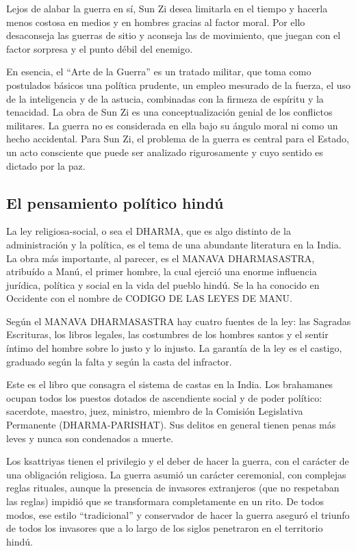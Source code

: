 \documentclass[
]{book}
\begin{document}
Lejos de alabar la guerra en sí, Sun Zi desea limitarla en el tiempo y hacerla menos costosa en medios y en hombres gracias al factor moral. Por ello desaconseja las guerras de sitio y aconseja las de movimiento, que juegan con el factor sorpresa y el punto débil del enemigo.

En esencia, el ``Arte de la Guerra'' es un tratado militar, que toma como postulados básicos una política prudente, un empleo mesurado de la fuerza, el uso de la inteligencia y de la astucia, combinadas con la firmeza de espíritu y la tenacidad. La obra de Sun Zi es una conceptualización genial de los conflictos militares. La guerra no es considerada en ella bajo su ángulo moral ni como un hecho accidental. Para Sun Zi, el problema de la guerra es central para el Estado, un acto consciente que puede ser analizado rigurosamente y cuyo sentido es dictado por la paz.

\hypertarget{el-pensamiento-poluxedtico-hinduxfa}{%
\subsection*{El pensamiento político hindú}\label{el-pensamiento-poluxedtico-hinduxfa}}

La ley religiosa-social, o sea el DHARMA, que es algo distinto de la administración y la política, es el tema de una abundante literatura en la India. La obra más importante, al parecer, es el MANAVA DHARMASASTRA, atribuído a Manú, el primer hombre, la cual ejerció una enorme influencia jurídica, política y social en la vida del pueblo hindú. Se la ha conocido en Occidente con el nombre de CODIGO DE LAS LEYES DE MANU.

Según el MANAVA DHARMASASTRA hay cuatro fuentes de la ley: las Sagradas Escrituras, los libros legales, las costumbres de los hombres santos y el sentir íntimo del hombre sobre lo justo y lo injusto. La garantía de la ley es el castigo, graduado según la falta y según la casta del infractor.

Este es el libro que consagra el sistema de castas en la India. Los brahamanes ocupan todos los puestos dotados de ascendiente social y de poder político: sacerdote, maestro, juez, ministro, miembro de la Comisión Legislativa Permanente (DHARMA-PARISHAT). Sus delitos en general tienen penas más leves y nunca son condenados a muerte.

Los ksattriyas tienen el privilegio y el deber de hacer la guerra, con el carácter de una obligación religiosa. La guerra asumió un carácter ceremonial, con complejas reglas rituales, aunque la presencia de invasores extranjeros (que no respetaban las reglas) impidió que se transformara completamente en un rito. De todos modos, ese estilo ``tradicional'' y conservador de hacer la guerra aseguró el triunfo de todos los invasores que a lo largo de los siglos penetraron en el territorio hindú.
\end{document}
